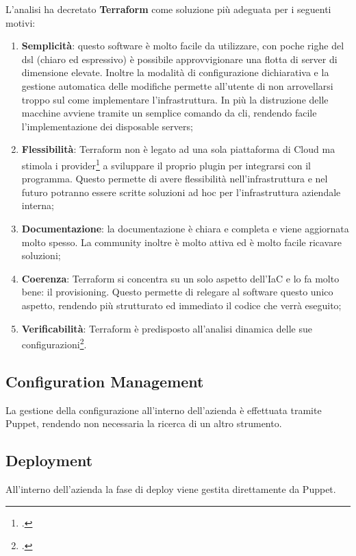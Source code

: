 L'analisi ha decretato \textbf{Terraform} come soluzione più adeguata per i seguenti motivi:
\begin{enumerate}
	\item \textbf{Semplicità}: questo software è molto facile da utilizzare, con poche righe del \gls{dsl} (chiaro ed espressivo) è possibile approvvigionare una flotta di server di dimensione elevate. Inoltre la modalità di configurazione dichiarativa e la gestione automatica delle modifiche permette all'utente di non arrovellarsi troppo sul come implementare l'infrastruttura. In più la distruzione delle macchine avviene tramite un semplice comando da \gls{cli}, rendendo facile l'implementazione dei disposable servers;
	\item \textbf{Flessibilità}: Terraform non è legato ad una sola piattaforma di Cloud ma stimola i provider\footcite{article:terraformextend} a sviluppare il proprio \gls{plugin} per integrarsi con il programma. Questo permette di avere flessibilità nell'infrastruttura e nel futuro potranno essere scritte soluzioni ad hoc per l'infrastruttura aziendale interna;
	\item \textbf{Documentazione}: la documentazione è chiara e completa e viene aggiornata molto spesso. La community inoltre è molto attiva ed è molto facile ricavare soluzioni;
	\item \textbf{Coerenza}: Terraform si concentra su un solo aspetto dell'IaC e lo fa molto bene: il provisioning. Questo permette di relegare al software questo unico aspetto, rendendo più strutturato ed immediato il codice che verrà eseguito;
	\item \textbf{Verificabilità}: Terraform è predisposto all'analisi dinamica delle sue configurazioni\footcite{article:terraformtest}.
\end{enumerate}
\subsection{Configuration Management}
La gestione della configurazione all'interno dell'azienda è effettuata tramite Puppet, rendendo non necessaria la ricerca di un altro strumento.  
\subsection{Deployment}
All'interno dell'azienda la fase di \gls{deploy} viene gestita direttamente da Puppet.
